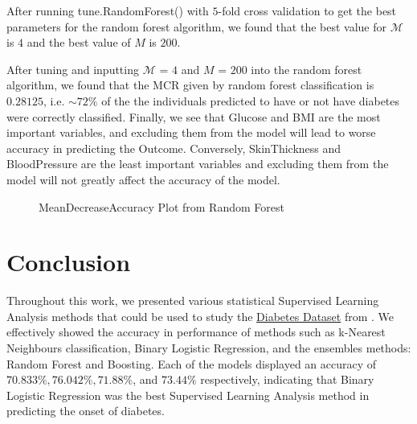 \documentclass[12pt]{article}
\begin{document}
\begin{indent}
\onehalfspacing

After running tune.RandomForest() with $5$-fold cross validation to get the best parameters for the random forest algorithm, we found that the best value for $\mathcal{M}$ is $4$ and the best value of $M$ is $200$. 

After tuning and inputting $\mathcal{M}$ = $4$ and $M$ = $200$ into the random forest algorithm, we found that the MCR given by random forest classification is $0.28125$, i.e. $\sim72\%$ of the the individuals predicted to have or not have diabetes were correctly classified.
Finally, we see that Glucose and BMI are the most important variables, and excluding them from the model will lead to worse accuracy in predicting the Outcome. Conversely, SkinThickness and BloodPressure are the least important variables and excluding them from the model will not greatly affect the accuracy of the model.
\end{indent}

\begin{figure}[h!]
	\centering
 	\caption{MeanDecreaseAccuracy Plot from Random Forest} 
	\label{fig:RFPlot}
\end{figure}


\section{Conclusion}
\indent
\onehalfspacing

Throughout this work, we presented various statistical Supervised Learning Analysis methods that could be used to study the \href{https://www.kaggle.com/datasets/hasibur013/diabetes-dataset}{Diabetes Dataset} from \cite{Kaggles}. We effectively showed the accuracy in performance of methods such as k-Nearest Neighbours classification, Binary Logistic Regression, and the ensembles methods: Random Forest and Boosting. Each of the models displayed an accuracy of $70.833\%, 76.042\%, 71.88\%$, and $73.44\%$ respectively, indicating that Binary Logistic Regression was the best Supervised Learning Analysis method in predicting the onset of diabetes. 
\end{document}
